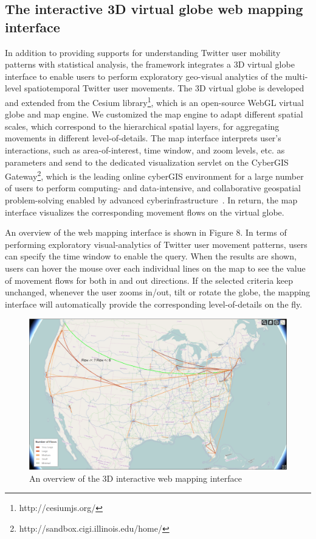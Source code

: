 \documentclass[a4paper, 11pt]{article}
\begin{document}
\subsection{The interactive 3D virtual globe web mapping interface}
In addition to providing supports for understanding Twitter user mobility patterns with statistical analysis, the framework integrates a 3D virtual globe interface to enable users to perform exploratory geo-visual analytics of the multi-level spatiotemporal Twitter user movements. 
The 3D virtual globe is developed and extended from the Cesium library\footnote{http://cesiumjs.org/}, which is an open-source WebGL virtual globe and map engine. 
We customized the map engine to adapt different spatial scales, which correspond to the hierarchical spatial layers,  for aggregating movements in different level-of-details.
The map interface interprets user's interactions, such as area-of-interest, time window, and zoom levels, etc. as parameters and send to the dedicated visualization servlet on the CyberGIS Gateway\footnote{http://sandbox.cigi.illinois.edu/home/}, which is the leading online cyberGIS environment for a large number of users to perform computing- and data-intensive, and collaborative geospatial problem-solving enabled by advanced cyberinfrastructure~\citep{liu2014cybergis}.
In return, the map interface visualizes the corresponding movement flows on the virtual globe.

An overview of the web mapping interface is shown in Figure 8. In terms of performing exploratory visual-analytics of Twitter user movement patterns, users can specify the time window to enable the query. 
When the results are shown, users can hover the mouse over each individual lines on the map to see the value of movement flows for both in and out directions. If the selected criteria keep unchanged, whenever the user zooms in/out, tilt or rotate the globe, the mapping interface will automatically provide the corresponding level-of-details on the fly.

\begin{figure}[h]
\centering
\includegraphics[width=0.8\linewidth]{./figures/vocation}
\caption{An overview of the 3D interactive web mapping interface}
\label{fig:Web_Interface}
\end{figure}
\end{document}

